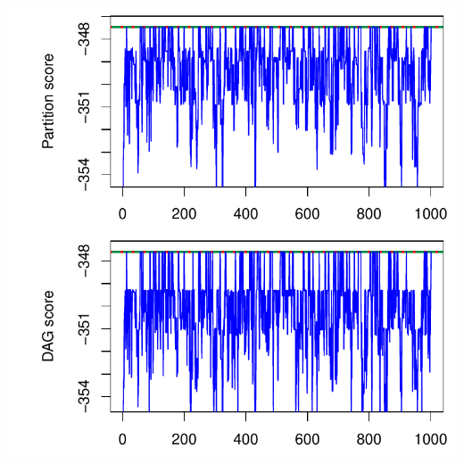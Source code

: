 \documentclass[a4paper]{article}\usepackage[]{graphicx}\usepackage[]{color}
\makeatletter
\def\maxwidth{ %
  \ifdim\Gin@nat@width>\linewidth
    \linewidth
  \else
    \Gin@nat@width
  \fi
}
\newenvironment{knitrout}{}{} %
\makeatother
\begin{document}
\begin{knitrout}
{\centering \includegraphics[width=\maxwidth]{figure/minimal-unnamed-chunk-29-1} 

}



\end{knitrout}
\end{document}
